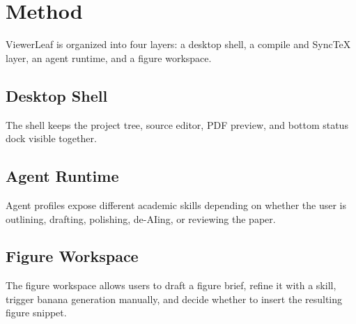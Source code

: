 \section{Method}
ViewerLeaf is organized into four layers: a desktop shell, a compile and SyncTeX layer, an agent runtime, and a figure workspace.

\subsection{Desktop Shell}
The shell keeps the project tree, source editor, PDF preview, and bottom status dock visible together.

\subsection{Agent Runtime}
Agent profiles expose different academic skills depending on whether the user is outlining, drafting, polishing, de-AIing, or reviewing the paper.

\subsection{Figure Workspace}
The figure workspace allows users to draft a figure brief, refine it with a skill, trigger banana generation manually, and decide whether to insert the resulting figure snippet.
